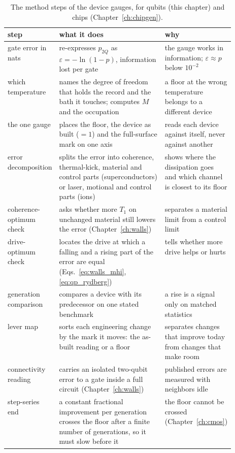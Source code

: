 \begin{table}[htbp]\centering\small
\caption{The method steps of the device gauges, for qubits (this chapter) and chips (Chapter~\ref{ch:chipgen}).}\label{tab:qp_steps}
\begin{tabularx}{\linewidth}{@{}>{\raggedright\arraybackslash}p{0.22\linewidth}>{\raggedright\arraybackslash}X>{\raggedright\arraybackslash}p{0.30\linewidth}@{}}\toprule
step & what it does & why \\\midrule
gate error in nats & re-expresses $p_{2Q}$ as $\varepsilon=-\ln(1-p)$, information lost per gate & the gauge works in information; $\varepsilon\approx p$ below $10^{-2}$ \\
which temperature & names the degree of freedom that holds the record and the bath it touches; computes $M$ and the occupation & a floor at the wrong temperature belongs to a different device \\
the one gauge & places the floor, the device as built ($=1$) and the full-surface mark on one axis & reads each device against itself, never against another \\
error decomposition & splits the error into coherence, thermal-kick, material and control parts (superconductors) or laser, motional and control parts (ions) & shows where the dissipation goes and which channel is closest to its floor \\
coherence-optimum check & asks whether more $T_1$ on unchanged material still lowers the error (Chapter~\ref{ch:walls}) & separates a material limit from a control limit \\
drive-optimum check & locates the drive at which a falling and a rising part of the error are equal (Eqs.~\eqref{eq:walls_mhi}, \eqref{eq:qp_rydberg}) & tells whether more drive helps or hurts \\
generation comparison & compares a device with its predecessor on one stated benchmark & a rise is a signal only on matched statistics~\cite{Proctor2022,McKay2023} \\
lever map & sorts each engineering change by the mark it moves: the as-built reading or a floor & separates changes that improve today from changes that make room \\
connectivity reading & carries an isolated two-qubit error to a gate inside a full circuit (Chapter~\ref{ch:walls}) & published errors are measured with neighbors idle \\
step-series end & a constant fractional improvement per generation crosses the floor after a finite number of generations, so it must slow before it & the floor cannot be crossed (Chapter~\ref{ch:cmos}) \\\bottomrule
\end{tabularx}
\end{table}

